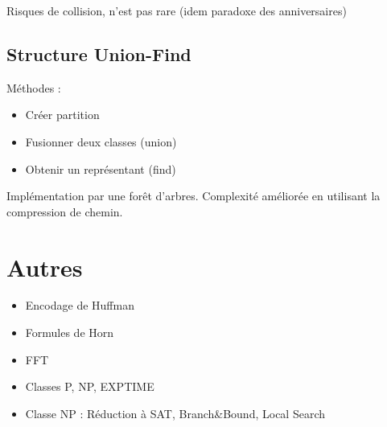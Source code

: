 \documentclass[10pt,a4paper]{article}
\begin{document}
Risques de collision, n'est pas rare (idem paradoxe des anniversaires)

\subsection{Structure Union-Find}

Méthodes : 
\begin{itemize}[noitemsep]
	\item Créer partition
	\item Fusionner deux classes (union)
	\item Obtenir un représentant (find)
\end{itemize}

Implémentation par une forêt d'arbres. %
Complexité améliorée en utilisant la compression de chemin.




\section{Autres}

\begin{itemize}[noitemsep]
	\item Encodage de Huffman
	\item Formules de Horn
	\item FFT
	\item Classes P, NP, EXPTIME
	\item Classe NP : Réduction à SAT, Branch\&Bound, Local Search
\end{itemize}
\end{document}
